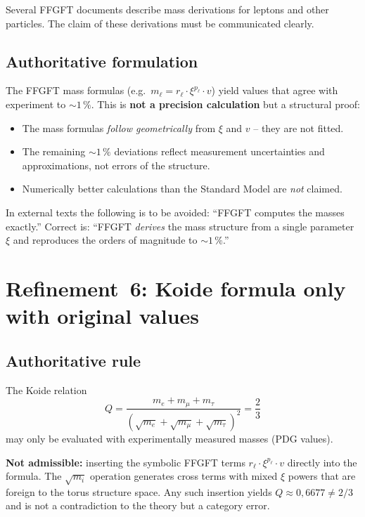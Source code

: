 Several FFGFT documents describe mass derivations for leptons and other
particles. The claim of these derivations must be communicated clearly.

\subsection*{Authoritative formulation}

The FFGFT mass formulas (e.g.\ $m_\ell = r_\ell \cdot \xi^{p_\ell} \cdot v$)
yield values that agree with experiment to $\sim 1\,\%$. This is \textbf{not a
precision calculation} but a structural proof:

\begin{itemize}
  \item The mass formulas \emph{follow geometrically} from $\xi$ and $v$ --
    they are not fitted.
  \item The remaining $\sim 1\,\%$ deviations reflect measurement
    uncertainties and approximations, not errors of the structure.
  \item Numerically better calculations than the Standard Model are
    \emph{not} claimed.
\end{itemize}

In external texts the following is to be avoided: ``FFGFT computes the masses
exactly.'' Correct is: ``FFGFT \emph{derives} the mass structure from a single
parameter $\xi$ and reproduces the orders of magnitude to $\sim 1\,\%$.''

\section{Refinement~6: Koide formula only with original values}

\subsection*{Authoritative rule}

The Koide relation
\begin{equation}
  Q = \frac{m_e + m_\mu + m_\tau}{(\sqrt{m_e}+\sqrt{m_\mu}+\sqrt{m_\tau})^2} = \frac{2}{3}
  \tag{190.11}
\end{equation}
may only be evaluated with experimentally measured masses (PDG values).

\textbf{Not admissible:} inserting the symbolic FFGFT terms
$r_\ell \cdot \xi^{p_\ell} \cdot v$ directly into the formula. The
$\sqrt{m_i}$ operation generates cross terms with mixed $\xi$ powers that are
foreign to the torus structure space. Any such insertion yields
$Q \approx 0{,}6677 \neq 2/3$ and is not a contradiction to the theory but a
category error.

